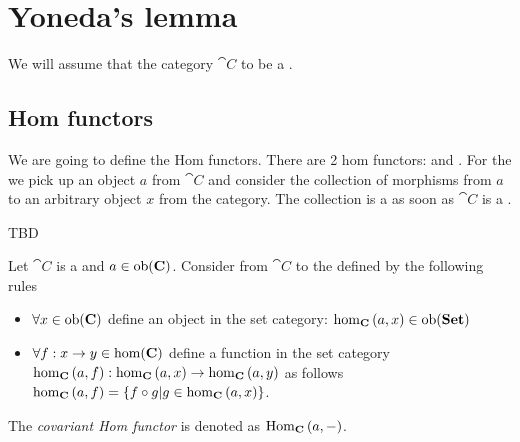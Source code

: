 \chapter{Yoneda's lemma}
\label{sec:yoneda}
We will assume that the category $\cat{C}$ to be a
.
\section{Hom functors}

We are going to define the Hom functors. There are 2 hom functors:
 and
. For the
 we pick up an object $a$ from 
$\cat{C}$ and consider the collection of morphisms from $a$ to an
arbitrary object $x$ from the category. The collection is a
 as soon as $\cat{C}$ is a
. 

TBD


\begin{definition}
\label{def:cov_hom_functor}
Let $\cat{C}$ is a  and $a \in
\mathrm{ob}(\mathbf{C})$. Consider  from $\cat{C}$ to the
 defined by the following rules
\begin{itemize}
\item $\forall x \in \mathrm{ob}(\mathbf{C})$ define an object in the set category:
  $\catmset[C]{a}{x} \in \catob{Set}$ 
\item $\forall f: x \to y \in \mathrm{hom}(\mathbf{C})$ define a function in the set category
  $\catmset[C]{a}{f}: \catmset[C]{a}{x} \to \catmset[C]{a}{y}$ as follows
  $\catmset[C]{a}{f} = \{f \circ g | g \in \catmset[C]{a}{x}\}$.
\end{itemize}  
The \textit{covariant Hom functor} is denoted as $\mathrm{Hom}_{\mathbf{C}}\left(a, -\right)$.
\end{definition}

